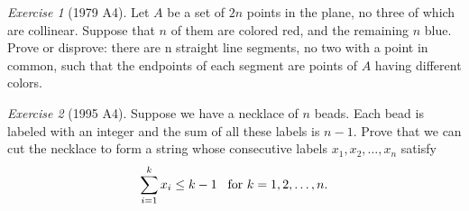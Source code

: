 \documentclass{article}
\theoremstyle{definition}
\theoremstyle{remark}
\newtheorem{exercise}{Exercise}
\begin{document}
\begin{exercise}[1979 A4]
Let $A$ be a set of $2n$ points in the plane, no three of which are collinear. Suppose that $n$ of them are colored red, and the remaining $n$ blue. Prove or disprove: there are n straight line segments, no two with a point in common, such that the endpoints of each segment are points of $A$ having different colors. 
\end{exercise}

\begin{exercise}[1995 A4]
Suppose we have a necklace of $n$ beads. Each bead is labeled with an integer and the sum of all these labels is $n - 1$. Prove that we can cut the necklace to form a string whose consecutive labels $x_1,x_2, \ldots, x_n$ satisfy
\[\sum_{i = 1}^{k} x_{i} \leq k - 1 \hspace{3mm} \text{for $k = 1, 2, \ldots, n$}.
\]
\end{exercise}
\end{document}
